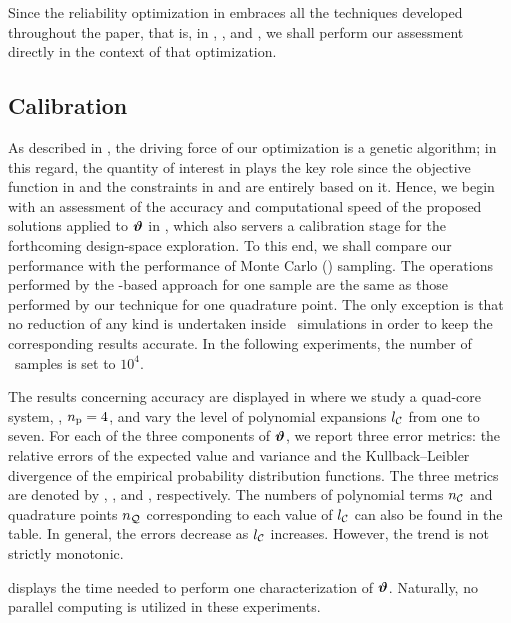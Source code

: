 Since the reliability optimization in  embraces all the techniques developed throughout the paper, that is, in , , and , we shall perform our assessment directly in the context of that optimization.

\subsection{Calibration} 
As described in , the driving force of our optimization is a genetic algorithm; in this regard, the quantity of interest in  plays the key role since the objective function in  and the constraints in  and  are entirely based on it.
Hence, we begin with an assessment of the accuracy and computational speed of the proposed solutions applied to $\bm{\vartheta}$ in , which also servers a calibration stage for the forthcoming design-space exploration.
To this end, we shall compare our performance with the performance of Monte Carlo (\MC) sampling.
The operations performed by the \MC-based approach for one sample are the same as those performed by our technique for one quadrature point.
The only exception is that no reduction of any kind is undertaken inside \MC\ simulations in order to keep the corresponding results accurate.
In the following experiments, the number of \MC\ samples is set to $10^4$.


The results concerning accuracy are displayed in  where we study a quad-core system, \ie, ${n_\text{p}} = 4$, and vary the level of polynomial expansions ${l_\mathcal{C}}$ from one to seven.
For each of the three components of $\bm{\vartheta}$, we report three error metrics: the relative errors of the expected value and variance and the Kullback--Leibler divergence of the empirical probability distribution functions.
The three metrics are denoted by \eE, \eV, and \eD, respectively.
The numbers of polynomial terms ${n_\mathcal{C}}$ and quadrature points ${n_\mathcal{Q}}$ corresponding to each value of ${l_\mathcal{C}}$ can also be found in the table.
In general, the errors decrease as ${l_\mathcal{C}}$ increases.
However, the trend is not strictly monotonic.

 displays the time needed to perform one characterization of $\bm{\vartheta}$.
Naturally, no parallel computing is utilized in these experiments.


